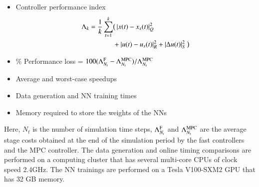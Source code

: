 \documentclass[preprint,5p, twocolumn, authoryear]{elsarticle}
\begin{document}
\begin{itemize}
    \item Controller performance index
    \begin{align*}        
    \Lambda_k = \dfrac{1}{k}\sum_{t=1}^{k} & \big(\left| x(t) - x_{s} (t) \right|^2_{Q} \\
        & + \left| u(t) - u_{s} (t) \right|^2_{R} + \left| \Delta u(t) \right|^2_{S}\big)         
    \end{align*}
    \item \% Performance loss = $100(\Lambda^{\textnormal{F}}_{N_{t}} - \Lambda^{\textnormal{MPC}}_{N_{t}})/\Lambda^{\textnormal{MPC}}_{N_{t}}$
    \item Average and worst-case speedups
    \item Data generation and NN training times
    \item Memory required to store the weights of the NNs
\end{itemize}
Here, $N_t$ is the number of simulation time steps,  
$\Lambda^{\textnormal{F}}_{N_{t}}$ and 
$\Lambda^{\textnormal{MPC}}_{N_{t}}$
are the average stage costs obtained 
at the end of the simulation period by the 
fast controllers and the MPC controller.
The data generation and online timing comparisons are 
performed on a computing cluster that has 
several multi-core CPUs of clock speed 2.4GHz. 
The NN trainings are performed on a 
Tesla V100-SXM2 GPU that has 32 GB memory.
\end{document}

